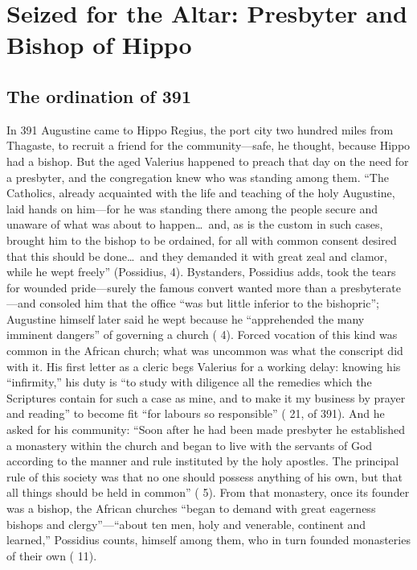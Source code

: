 \section{Seized for the Altar: Presbyter and Bishop of Hippo}

\subsection{The ordination of 391}

In 391 Augustine came to Hippo Regius, the port city two hundred miles from
Thagaste, to recruit a friend for the community---safe, he thought, because
Hippo had a bishop. But the aged Valerius happened to preach that day on the
need for a presbyter, and the congregation knew who was standing among them.
``The Catholics, already acquainted with the life and teaching of the holy
Augustine, laid hands on him---for he was standing there among the people
secure and unaware of what was about to happen\ldots\ and, as is the custom
in such cases, brought him to the bishop to be ordained, for all with common
consent desired that this should be done\ldots\ and they demanded it with
great zeal and clamor, while he wept freely'' (Possidius,  4).
Bystanders, Possidius adds, took the tears for wounded pride---surely the
famous convert wanted more than a presbyterate---and consoled him that the
office ``was but little inferior to the bishopric''; Augustine himself later
said he wept because he ``apprehended the many imminent dangers'' of
governing a church ( 4). Forced vocation of this kind was common
in the African church; what was uncommon was what the conscript did with it.
His first letter as a cleric begs Valerius for a working delay: knowing his
``infirmity,'' his duty is ``to study with diligence all the remedies which
the Scriptures contain for such a case as mine, and to make it my business
by prayer and reading'' to become fit ``for labours so responsible''
( 21, of 391). And he asked for his community: ``Soon after he
had been made presbyter he established a
monastery within the church and began to live with the servants of God
according to the manner and rule instituted by the holy apostles. The
principal rule of this society was that no one should possess anything of
his own, but that all things should be held in common''
( 5). From that monastery, once its founder was a bishop, the
African churches ``began to demand with great eagerness bishops and
clergy''---``about ten men, holy and venerable, continent and learned,''
Possidius counts, himself among them, who in turn founded monasteries of
their own ( 11).

